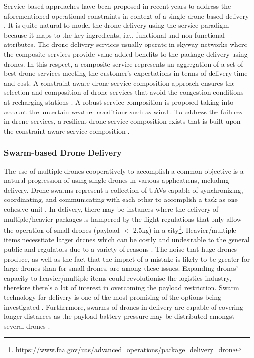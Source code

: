 \documentclass[conference]{IEEEtran}
\begin{document}
Service-based approaches have been proposed in recent years to address the aforementioned operational constraints in context of a single drone-based delivery \cite{babar2021topk,9284115}. It is quite natural to model the drone delivery using the service paradigm because it maps to the key ingredients, i.e., functional and non-functional attributes. The drone delivery services usually operate in skyway networks where the composite services provide value-added benefits to the package delivery using drones. In this respect, a composite service represents an aggregation of a set of best drone services meeting the customer's expectations in terms of delivery time and cost. A constraint-aware drone service composition approach ensures the selection and composition of drone services that avoid the congestion conditions at recharging stations \cite{shahzaad2019constraint}. A robust service composition is proposed taking into account the uncertain weather conditions such as wind \cite{shahzaad2021robust}. To address the failures in drone services, a resilient drone service composition exists that is built upon the constraint-aware service composition \cite{2021335}.

\subsubsection{Swarm-based Drone Delivery}
The use of multiple drones cooperatively to accomplish a common objective is a natural progression of using single drones in various applications, including delivery. Drone swarms represent a collection of UAVs capable of synchronizing, coordinating, and communicating with each other to accomplish a task as one cohesive unit \cite{tahir2019swarms}. In delivery, there may be instances where the delivery of multiple/heavier packages is hampered by the flight regulations that only allow the operation of small drones (payload $<$ 2.5kg) in a city\footnote{https://www.faa.gov/uas/advanced\_operations/package\_delivery\_drone}. Heavier/multiple items necessitate larger drones which can be costly and undesirable to the general public and regulators due to a variety of reasons \cite{alkouz2021provider}. The noise that huge drones produce, as well as the fact that the impact of a mistake is likely to be greater for large drones than for small drones, are among these issues. Expanding drones' capacity to heavier/multiple items could revolutionise the logistics industry, therefore there's a lot of interest in overcoming the payload restriction. Swarm technology for delivery is one of the most promising of the options being investigated \cite{alkouz2020swarm}. Furthermore, swarms of drones in delivery are capable of covering longer distances as the payload-battery pressure may be distributed amongst several drones \cite{alkouz2020formation}.
\end{document}
